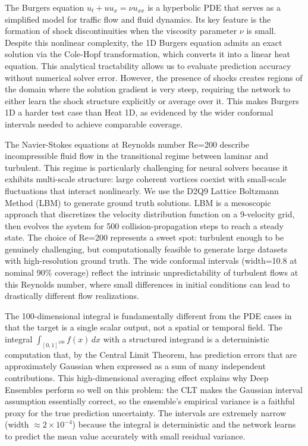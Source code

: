 \documentclass[12pt,a4paper]{article}
\theoremstyle{plain}
\begin{document}
The Burgers equation $u_t + uu_x = \nu u_{xx}$ is a hyperbolic PDE that
serves as a simplified model for traffic flow and fluid dynamics. Its
key feature is the formation of shock discontinuities when the viscosity
parameter $\nu$ is small. Despite this nonlinear complexity, the 1D Burgers
equation admits an exact solution via the Cole-Hopf transformation, which
converts it into a linear heat equation. This analytical tractability allows
us to evaluate prediction accuracy without numerical solver error. However,
the presence of shocks creates regions of the domain where the solution
gradient is very steep, requiring the network to either learn the shock
structure explicitly or average over it. This makes Burgers 1D a harder
test case than Heat 1D, as evidenced by the wider conformal intervals
needed to achieve comparable coverage.

The Navier-Stokes equations at Reynolds number Re=200 describe incompressible
fluid flow in the transitional regime between laminar and turbulent. This
regime is particularly challenging for neural solvers because it exhibits
multi-scale structure: large coherent vortices coexist with small-scale
fluctuations that interact nonlinearly. We use the D2Q9 Lattice Boltzmann
Method (LBM) to generate ground truth solutions. LBM is a mesoscopic approach
that discretizes the velocity distribution function on a 9-velocity grid,
then evolves the system for 500 collision-propagation steps to reach a
steady state. The choice of Re=200 represents a sweet spot: turbulent enough
to be genuinely challenging, but computationally feasible to generate large
datasets with high-resolution ground truth. The wide conformal intervals
(width=10.8 at nominal 90\% coverage) reflect the intrinsic unpredictability
of turbulent flows at this Reynolds number, where small differences in initial
conditions can lead to drastically different flow realizations.

The 100-dimensional integral is fundamentally different from the PDE cases
in that the target is a single scalar output, not a spatial or temporal field.
The integral $\int_{[0,1]^{100}} f(x) \, dx$ with a structured integrand is
a deterministic computation that, by the Central Limit Theorem, has prediction
errors that are approximately Gaussian when expressed as a sum of many
independent contributions. This high-dimensional averaging effect explains
why Deep Ensembles perform so well on this problem: the CLT makes the Gaussian
interval assumption essentially correct, so the ensemble's empirical variance
is a faithful proxy for the true prediction uncertainty. The intervals are
extremely narrow (width $\approx 2 \times 10^{-4}$) because the integral is
deterministic and the network learns to predict the mean value accurately
with small residual variance.
\end{document}
